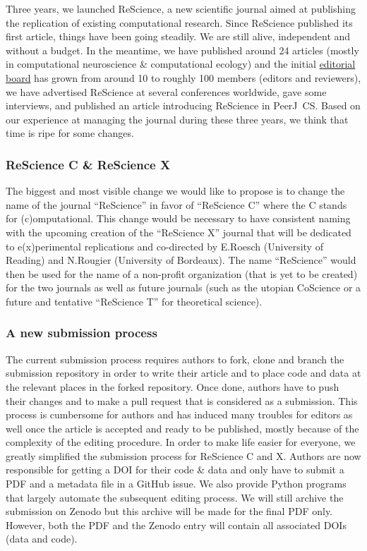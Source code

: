 Three years, we launched ReScience, a new scientific journal aimed at publishing the
replication of existing computational research. Since ReScience published its first
article\supercite{Topalidou:2015}, things have been
going steadily. We are still alive, independent and without a budget. In the
meantime, we have published around 24 articles (mostly in computational
neuroscience \& computational ecology) and the initial
\href{https://rescience-c.github.io/board/}{editorial board} has grown from
around 10 to roughly 100 members (editors and reviewers), we have advertised
ReScience at several conferences worldwide, gave some
interviews\supercite{Science:2018}, and published an article introducing
ReScience in PeerJ~CS\supercite{Rougier:2017}. Based on our
experience\supercite{Rougier:2018} at managing the journal during these three
years, we think that time is ripe for some changes.

\subsubsection{ReScience C \& ReScience X}

The biggest and most visible change we would like to propose is to change the
name of the journal ``ReScience'' in favor of ``ReScience C'' where the C
stands for (c)omputational. This change would be necessary to have consistent
naming with the upcoming creation of the ``ReScience X'' journal that will be
dedicated to e(x)perimental replications and co-directed by E.Roesch
(University of Reading) and N.Rougier (University of Bordeaux). The name
``ReScience'' would then be used for the name of a non-profit organization
(that is yet to be created) for the two journals as well as future journals
(such as the utopian CoScience\supercite{Rougier:2017} or a future and
tentative ``ReScience T'' for theoretical science).


\subsubsection{A new submission process}

The current submission process requires authors to fork, clone and branch the
submission repository in order to write their article and to place code and
data at the relevant places in the forked repository. Once done, authors have
to push their changes and to make a pull request that is considered as a
submission. This process is cumbersome for authors and has induced many
troubles for editors as well once the article is accepted and ready to be
published, mostly because of the complexity of the editing procedure. In order
to make life easier for everyone, we greatly simplified the submission process
for ReScience C and X. Authors are now responsible for getting a DOI for their
code \& data and only have to submit a PDF and a metadata file in a GitHub
issue.
We also provide Python programs that largely automate the subsequent editing
process. We will still archive the submission on Zenodo but this archive will
be made for the final PDF only. However, both the PDF and the Zenodo entry will
contain all associated DOIs (data and code).


